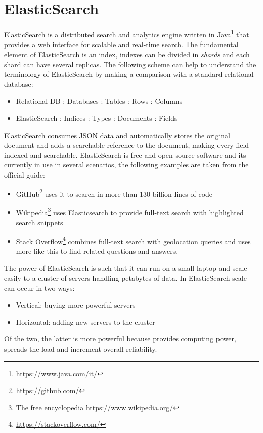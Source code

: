 \section{ElasticSearch}
\label{sec:elasticsearch}
ElasticSearch is a distributed search and analytics engine written in Java\footnote{\url{https://www.java.com/it/}} that provides a web interface 
for scalable and real-time search\cite{gormley2015elasticsearch}. 
The fundamental element of ElasticSearch is an index, indexes can be divided in \textit{shards}
and each shard can have several replicas.
The following scheme can help to understand the terminology of ElasticSearch by making a comparison with a standard relational database:
\begin{itemize}
  \item Relational DB :  Databases : Tables : Rows  : Columns
  \item ElasticSearch :  Indices  : Types : Documents : Fields
\end{itemize}

ElasticSearch consumes JSON data and automatically stores the original document and adds a searchable reference to the document, making every field
indexed and searchable.
ElasticSearch is free and open-source software and its currently in use in several scenarios, the following examples are taken from the official guide:
\begin{itemize}
  \item GitHub\footnote{\url{https://github.com/}} uses it to search in more than 130 billion lines of code
  \item Wikipedia\footnote{The free encyclopedia \url{https://www.wikipedia.org/} } uses Elasticsearch to provide full-text search with highlighted search snippets
  \item Stack Overflow\footnote{\url{https://stackoverflow.com/}} combines full-text search with geolocation queries and uses more-like-this to find related questions and
  answers.
\end{itemize}

The power of ElasticSearch is such that it can run on a small laptop and scale easily to a cluster of servers handling petabytes of data.
In ElasticSearch scale can occur in two ways:
\begin{itemize}
  \item Vertical: buying more powerful servers 
  \item Horizontal: adding new servers to the cluster 
\end{itemize}
Of the two, the latter is more powerful because provides computing power, spreads the load and increment overall reliability.

